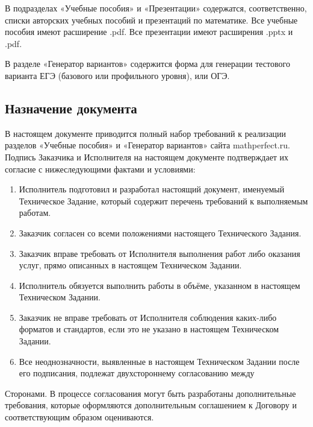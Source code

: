 В подразделах «Учебные пособия» и «Презентации» содержатся, соответственно, списки авторских учебных пособий и презентаций по математике. Все учебные пособия имеют расширение .pdf. Все презентации имеют расширения .pptx и .pdf.

В разделе «Генератор вариантов» содержится форма для генерации тестового варианта ЕГЭ (базового или профильного уровня), или ОГЭ.

\subsection{Назначение документа}
В настоящем документе приводится полный набор требований к реализации разделов «Учебные пособия» и «Генератор вариантов» сайта mathperfect.ru.
Подпись Заказчика и Исполнителя на настоящем документе подтверждает их согласие с нижеследующими фактами и условиями:
\begin{enumerate}
  \item Исполнитель подготовил и разработал настоящий документ, именуемый Техническое Задание, который содержит перечень требований к выполняемым работам.
  \item Заказчик согласен со всеми положениями настоящего Технического Задания.
  \item Заказчик вправе требовать от Исполнителя выполнения работ либо оказания услуг, прямо описанных в настоящем Техническом Задании.
  \item Исполнитель обязуется выполнить работы в объёме, указанном в настоящем Техническом Задании.
  \item Заказчик не вправе требовать от Исполнителя соблюдения каких-либо форматов и стандартов, если это не указано в настоящем Техническом Задании.
  \item Все неоднозначности, выявленные в настоящем Техническом Задании после его подписания, подлежат двухстороннему согласованию между
\end{enumerate}

Сторонами. В процессе согласования могут быть разработаны дополнительные требования, которые оформляются дополнительным соглашением к Договору и соответствующим образом оцениваются.

